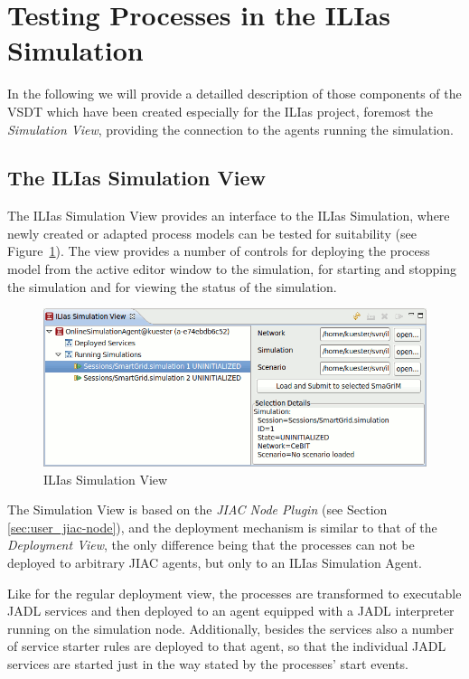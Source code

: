 \section{Testing Processes in the ILIas Simulation}

In the following we will provide a detailled description of those components of
the VSDT which have been created especially for the ILIas project, foremost the
\emph{Simulation View}, providing the connection to the agents running the
simulation.


\subsection{The ILIas Simulation View}

The ILIas Simulation View provides an interface to the ILIas Simulation, where
newly created or adapted process models can be tested for suitability (see
Figure~\ref{fig:ilias-simview}).  The view provides a number of controls for
deploying the process model from the active editor window to the simulation, for
starting and stopping the simulation and for viewing the status of the simulation.

\begin{figure}[ht]
	\centering
	\includegraphics[width=.6\textwidth]{ilias/ilias-view_110725.png}
	\caption{ILIas Simulation View}
	\label{fig:ilias-simview}
\end{figure}

The Simulation View is based on the \emph{JIAC Node Plugin} (see Section
\ref{sec:user_jiac-node}), and the deployment mechanism is similar to that of the
\emph{Deployment View}, the only difference being that the processes can not be
deployed to arbitrary JIAC agents, but only to an ILIas Simulation Agent.

Like for the regular deployment view, the processes are transformed to executable
JADL services and then deployed to an agent equipped with a JADL interpreter
running on the simulation node.  Additionally, besides the services also a number of
service starter rules are deployed to that agent, so that the individual JADL
services are started just in the way stated by the processes' start events.



